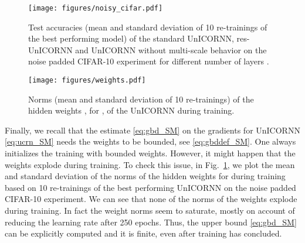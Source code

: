 \documentclass[a4paper]{article}
\newcommand{\fref}[1] {Fig.~\ref{#1}}
\begin{document}
\begin{figure}[ht!]
\centering
\begin{minipage}[t]{.48\textwidth}
\texttt{[image: figures/noisy\_cifar.pdf]}
\caption{Test accuracies (mean and standard deviation of 10 re-trainings of the best performing model) of the standard UnICORNN, res-UnICORNN and UnICORNN without multi-scale behavior on the noise padded CIFAR-10 experiment for different number of layers .}
\label{fig:cifar}
\end{minipage}\hspace{0.01\textwidth}
\begin{minipage}[t]{.48\textwidth}
\texttt{[image: figures/weights.pdf]}
\caption{Norms (mean and standard deviation of 10 re-trainings) of the hidden weights , for , of the UnICORNN during training.}
\label{fig:weights}
\end{minipage}
\end{figure}

Finally, we recall that the estimate \eqref{eq:gbd_SM} on the gradients for UnICORNN \eqref{eq:ucrn_SM} needs the weights to be bounded, see \eqref{eq:gbddef_SM}. One always initializes the training with bounded weights. However, it might happen that the weights explode during training. To check this issue, in  \fref{fig:weights}, we plot the mean and standard deviation of the norms of the hidden weights  for  during training based on 10 re-trainings of the best performing UnICORNN on the noise padded CIFAR-10 experiment. We can see that none of the norms of the weights explode during training. In fact the weight norms seem to saturate, mostly on account of reducing the learning rate after 250 epochs. Thus, the upper bound \eqref{eq:gbd_SM} can be explicitly computed and it is finite, even after training has concluded. 
\end{document}
